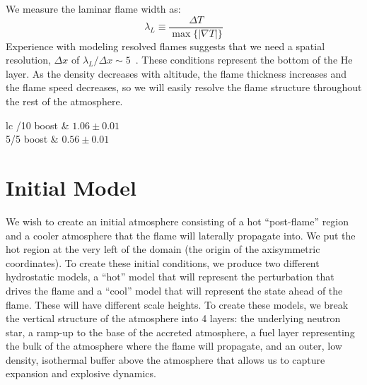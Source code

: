 \documentclass[preprint,times,tighten]{aastex63}
\begin{document}
We measure the laminar flame width as:
\begin{equation}
\lambda_L \equiv \frac{\Delta T}{\max\{|\nabla T|\}}
\end{equation}
Experience with modeling resolved flames suggests that we need a
spatial resolution, $\Delta x$ of $\lambda_L/\Delta x \sim 5$~\citep{SNld}.  These
conditions represent the bottom of the He layer.  As the density
decreases with altitude, the flame thickness increases and the flame
speed decreases, so we will easily resolve the flame structure throughout
the rest of the atmosphere.

\begin{deluxetable}{lc}
	/10 boost & $1.06 \pm 0.01$ \\
	5/5 boost & $0.56 \pm 0.01$ \\
	\enddata
\end{deluxetable}

\section{Initial Model}\label{Sec:inital_model}


We wish to create an initial atmosphere consisting of a hot
``post-flame'' region and a cooler atmosphere that the flame will
laterally propagate into.  We put the hot region at the very left of
the domain (the origin of the axisymmetric coordinates).  To create
these initial conditions, we produce two different hydrostatic models,
a ``hot'' model that will represent the perturbation that drives the
flame and a ``cool'' model that will represent the state ahead of the
flame.  These will have different scale heights.  To create these
models, we break the vertical structure of the atmosphere into 4
layers: the underlying neutron star, a ramp-up to the base of the
accreted atmosphere, a fuel layer representing the bulk of the
atmosphere where the flame will propagate, and an outer, low density,
isothermal buffer above the atmosphere that allows us
to capture expansion and explosive dynamics.  
\end{document}
